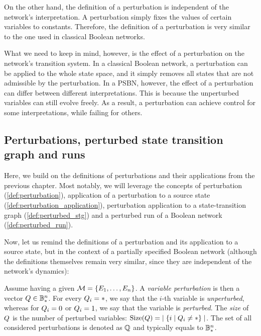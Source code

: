 On the other hand, the definition of a perturbation is independent of the network's interpretation. A perturbation simply fixes the values of certain variables to constants. Therefore, the definition of a perturbation is very similar to the one used in classical Boolean networks. 

What we need to keep in mind, however, is the effect of a perturbation on the network's transition system. In a classical Boolean network, a perturbation can be applied to the whole state space, and it simply removes all states that are not admissible by the perturbation. In a PSBN, however, the effect of a perturbation can differ between different interpretations. This is because the unperturbed variables can still evolve freely. As a result, a perturbation can achieve control for some interpretations, while failing for others.

\subsection{Perturbations, perturbed state transition graph and runs}

Here, we build on the definitions of perturbations and their applications from the previous chapter. Most notably, we will leverage the concepts of perturbation (\autoref{def:perturbation}), application of a perturbation to a source state (\autoref{def:perturbation_application}), perturbation application to a state-transition graph (\autoref{def:perturbed_stg}) and a perturbed run of a Boolean network (\autoref{def:perturbed_run}).

Now, let us remind the definitions of a perturbation and its application to a source state, but in the context of a partially specified Boolean network (although the definitions themselves remain very similar, since they are independent of the network's dynamics):

\begin{definition}
\label{def:psbn_perturbation}
Assume having a given \PBN{} $\mathcal{M} = \{E_1, \dots, E_n \}$. A \emph{variable perturbation} is then a vector $Q \in \mathbb{B}_{{*}}^n$. For every $Q_i = {*}$, we say that the $i$-th variable is \emph{unperturbed}, whereas for $Q_i = 0$ or $Q_i = 1$, we say that the variable is \emph{perturbed}. The \emph{size} of $Q$ is the number of perturbed variables: $\text{Size}(Q) = \; \mid \{ i \mid Q_i \neq {*} \} \mid$. The set of all considered perturbations is denoted as $\mathbb{Q}$ and typically equals to $\mathbb{B}_{{*}}^n$. 
\end{definition}

